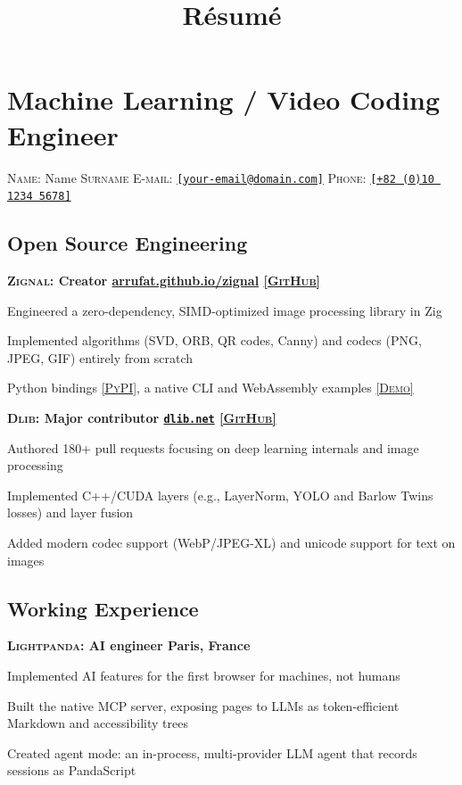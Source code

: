 \documentclass[10pt,a4paper]{article}
\title{Résumé}
\author{\myname{} \mysurname}
\makeatletter
\newcommand{\myname}{Name}
\newcommand{\mysurname}{Surname}
\newcommand{\myemail}{[your-email@domain.com]}
\newcommand{\myphonelink}{[+821012345678]}
\newcommand{\myphonetext}{[+82\,(0)10\,1234\,5678]}
\newcommand{\mysubsection}[1]{%
    \vspace{-0.5\baselineskip}\subsection*{#1}\vspace{-0.5\baselineskip}%
}
\newcommand{\sep}{\- \textbullet{} \-}
\newcommand{\entrylink}[2]{\href{#1}{\scriptsize\textsc{[#2]}}}
\newcommand{\pypi}[1]{\entrylink{#1}{PyPI}}
\newcommand{\github}[1]{\entrylink{#1}{GitHub}}
\newcommand{\entrydate}[1]{\marginnote{\small{\condensed{#1}}}}
\newcommand{\workentry}[4]{%
    \entrydate{#1}
    {\bf\textsc{#2}: {#3} \sep{} {#4}}\par
}
\makeatother
\begin{document}
\pagestyle{empty}
\setlength{\parindent}{0pt}

\section*{Machine Learning / Video Coding Engineer}
\textsc{Name:} \myname{} \textsc{\mysurname} \sep{}
\textsc{E-mail:} \href{mailto:\myemail}{\texttt{\myemail}} \sep{}
\textsc{Phone:} \href{tel:\myphonelink}{\texttt{\myphonetext}}


\mysubsection{Open Source Engineering}

\workentry{2024 — now}{Zignal}{Creator}{\href{https://arrufat.github.io/zignal/}{arrufat.github.io/zignal} \github{https://github.com/arrufat/zignal}}
Engineered a zero-dependency, SIMD-optimized image processing library in Zig
\begin{entrylist}
    \item Implemented algorithms (SVD, ORB, QR codes, Canny) and codecs (PNG, JPEG, GIF) entirely from scratch
    \item Python bindings \pypi{https://pypi.org/project/zignal-processing/}, a native CLI and WebAssembly examples \entrylink{https://arrufat.github.io/zignal/examples/}{Demo}
\end{entrylist}

\workentry{2019 — now}{Dlib}{Major contributor}{\href{https://dlib.net/}{\texttt{dlib.net}} \github{https://github.com/davisking/dlib/commits?author=arrufat}}
Authored 180+ pull requests focusing on deep learning internals and image processing
\begin{entrylist}
    \item Implemented C++/CUDA layers (e.g., LayerNorm, YOLO and Barlow Twins losses) and layer fusion
    \item Added modern codec support (WebP/JPEG-XL) and unicode support for text on images
\end{entrylist}

\mysubsection{Working Experience}

\workentry{2026 — now}{Lightpanda}{AI engineer}{Paris, France}
Implemented AI features for the first browser for machines, not humans
\begin{entrylist}
    \item Built the native MCP server, exposing pages to LLMs as token-efficient Markdown and accessibility trees
    \item Created agent mode: an in-process, multi-provider LLM agent that records sessions as PandaScript
\end{entrylist}
\end{document}
